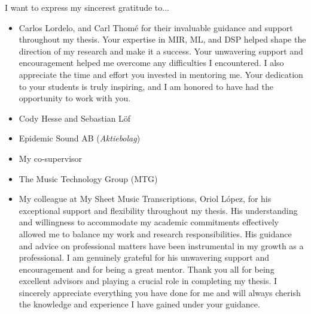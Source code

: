 

\begin{acknowledgement}

I want to express my sincerest gratitude to...

\begin{itemize}
\item Carlos Lordelo, and Carl Thomé for their invaluable guidance and support throughout my thesis. Your expertise in MIR, ML, and DSP helped shape the direction of my research and make it a success. Your unwavering support and encouragement helped me overcome any difficulties I encountered. I also appreciate the time and effort you invested in mentoring me. Your dedication to your students is truly inspiring, and I am honored to have had the opportunity to work with you.
\vspace*{3mm}
\item Cody Hesse and Sebastian Löf
\vspace*{3mm}
\item Epidemic Sound AB (\textit{Aktiebolag})
\vspace*{3mm}
\item My co-supervisor
\vspace*{3mm}
\item The Music Technology Group (MTG)
\vspace*{3mm}
\item My colleague at My Sheet Music Transcriptions, Oriol López, for his exceptional support and flexibility throughout my thesis. His understanding and willingness to accommodate my academic commitments effectively allowed me to balance my work and research responsibilities. His guidance and advice on professional matters have been instrumental in my growth as a professional. I am genuinely grateful for his unwavering support and encouragement and for being a great mentor.
\vspace*{3mm}
Thank you all for being excellent advisors and playing a crucial role in completing my thesis. I sincerely appreciate everything you have done for me and will always cherish the knowledge and experience I have gained under your guidance.
\vspace*{3mm}
\end{itemize}

\newpage
\end{acknowledgement}
